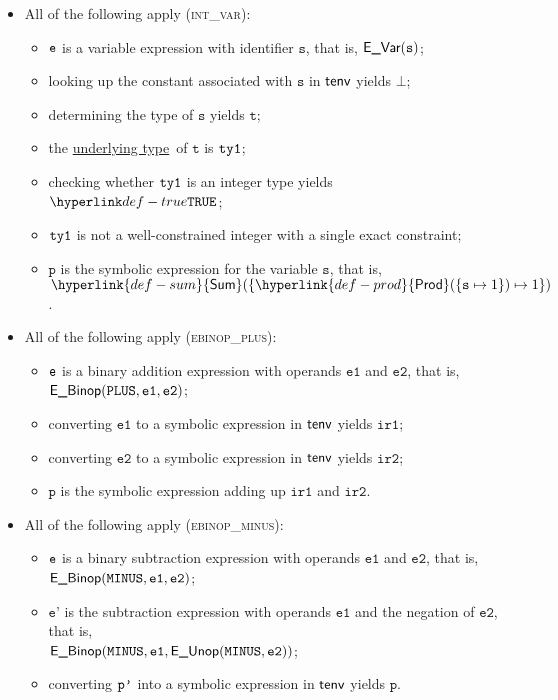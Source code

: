 \documentclass{book}
\newcommand\ProseOrTypeError[0]{\ProseTerminateAs{\TypeErrorConfig}}
\newcommand\Prod[0]{\hyperlink{def-prod}{\textsf{Prod}}}
\newcommand\Sum[0]{\hyperlink{def-sum}{\textsf{Sum}}}
\newcommand\underlyingtype[0]{\hyperlink{def-underlyingtype}{underlying type}}
\newcommand\vp[0]{\texttt{p}}
\newcommand\vt[0]{\texttt{t}}
\newcommand\veone[0]{\texttt{e1}}
\newcommand\vetwo[0]{\texttt{e2}}
\newcommand\vs[0]{\texttt{s}}
\newcommand\irone[0]{\texttt{ir1}}
\newcommand\irtwo[0]{\texttt{ir2}}
\newcommand\vep[0]{\texttt{e'}}
\begin{document}
\begin{itemize}
  \item All of the following apply (\textsc{int\_var}):
  \begin{itemize}
    \item $\texttt{e}$ is a variable expression with identifier $\vs$, that is, $\EVar(\vs)$;
    \item looking up the constant associated with $\vs$ in $\textsf{tenv}$ yields $\bot$;
    \item determining the type of $\vs$ yields $\vt$\ProseOrTypeError;
    \item the \underlyingtype\ of $\vt$ is $\texttt{ty1}$\ProseOrTypeError;
    \item checking whether $\texttt{ty1}$ is an integer type yields $\True$\ProseOrTypeError;
    \item $\texttt{ty1}$ is not a well-constrained integer with a single exact constraint;
    \item $\vp$ is the symbolic expression for the variable $\vs$, that is, $\Sum( \{ \Prod(\{\vs\mapsto 1\})\mapsto 1 \} )$.
  \end{itemize}

  \item All of the following apply (\textsc{ebinop\_plus}):
  \begin{itemize}
    \item $\texttt{e}$ is a binary addition expression with operands $\veone$ and $\vetwo$, that is, \\ $\EBinop(\PLUS, \veone, \vetwo)$;
    \item converting $\veone$ to a symbolic expression in $\textsf{tenv}$ yields $\irone$\ProseOrTypeErrorOrBot;
    \item converting $\vetwo$ to a symbolic expression in $\textsf{tenv}$ yields $\irtwo$\ProseOrTypeErrorOrBot;
    \item $\vp$ is the symbolic expression adding up $\irone$ and $\irtwo$.
  \end{itemize}

  \item All of the following apply (\textsc{ebinop\_minus}):
  \begin{itemize}
    \item $\texttt{e}$ is a binary subtraction expression with operands $\veone$ and $\vetwo$, that is, \\ $\EBinop(\MINUS, \veone, \vetwo)$;
    \item $\vep$ is the subtraction expression with operands $\veone$ and the negation of $\vetwo$, that is, \\ $\EBinop(\MINUS, \veone, \EUnop(\MINUS, \vetwo))$;
    \item converting $\texttt{p'}$ into a symbolic expression in $\textsf{tenv}$ yields $\vp$\ProseOrTypeErrorOrBot.
  \end{itemize}


\end{itemize}
\end{document}
